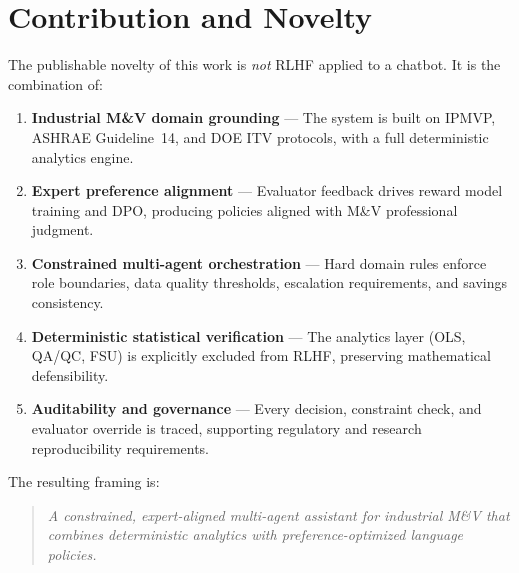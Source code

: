 \documentclass[11pt,a4paper]{article}
\begin{document}
\section{Contribution and Novelty}

The publishable novelty of this work is \emph{not} RLHF applied to a chatbot. It is the combination of:

\begin{enumerate}
    \item \textbf{Industrial M\&V domain grounding} — The system is built on IPMVP, ASHRAE Guideline~14, and DOE ITV protocols, with a full deterministic analytics engine.
    \item \textbf{Expert preference alignment} — Evaluator feedback drives reward model training and DPO, producing policies aligned with M\&V professional judgment.
    \item \textbf{Constrained multi-agent orchestration} — Hard domain rules enforce role boundaries, data quality thresholds, escalation requirements, and savings consistency.
    \item \textbf{Deterministic statistical verification} — The analytics layer (OLS, QA/QC, FSU) is explicitly excluded from RLHF, preserving mathematical defensibility.
    \item \textbf{Auditability and governance} — Every decision, constraint check, and evaluator override is traced, supporting regulatory and research reproducibility requirements.
\end{enumerate}

\noindent The resulting framing is:

\begin{quote}
\textit{A constrained, expert-aligned multi-agent assistant for industrial M\&V that combines deterministic analytics with preference-optimized language policies.}
\end{quote}
\end{document}
